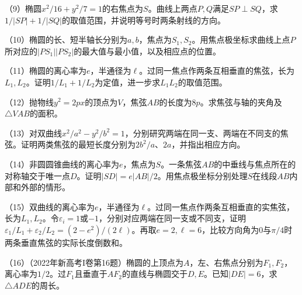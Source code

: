 \begin{exercise}
\begin{samepage}
（9）椭圆\(x^2/16+y^2/7=1\)的右焦点为\(S\)。曲线上两点\(P,Q\)满足\(SP\perp SQ\)，求\(1/|SP|+1/|SQ|\)的取值范围，并说明等号时两条射线的方向。
\par\end{samepage}
\begin{samepage}
（10）椭圆的长、短半轴长分别为\(a,b\)，焦点为\(S_1,S_2\)。用焦点极坐标求曲线上点\(P\)所对应的\(|PS_1||PS_2|\)的最大值与最小值，以及相应点的位置。
\par\end{samepage}
\begin{samepage}
（11）椭圆的离心率为\(e\)，半通径为\(\ell\)。过同一焦点作两条互相垂直的焦弦，长为\(L_1,L_2\)。证明\(1/L_1+1/L_2\)为定值，进一步求\(L_1L_2\)的取值范围。
\par\end{samepage}
\begin{samepage}
（12）抛物线\(y^2=2px\)的顶点为\(V\)，焦弦\(AB\)的长度为\(8p\)。求焦弦与轴的夹角及\(\triangle VAB\)的面积。
\par\end{samepage}
\begin{samepage}
（13）对双曲线\(x^2/a^2-y^2/b^2=1\)，分别研究两端在同一支、两端在不同支的焦弦。证明两类焦弦的最短长度分别为\(2b^2/a\)、\(2a\)，并指出相应方向。
\par\end{samepage}

\begin{samepage}
（14）非圆圆锥曲线的离心率为\(e\)，焦点为\(S\)。一条焦弦\(AB\)的中垂线与焦点所在的对称轴交于唯一点\(D\)。证明\(|SD|=e|AB|/2\)。用焦点极坐标分别处理\(S\)在线段\(AB\)内部和外部的情形。
\par\end{samepage}
\begin{samepage}
（15）双曲线的离心率为\(e\)，半通径为\(\ell\)。过同一焦点作两条互相垂直的实焦弦，长为\(L_1,L_2\)。令\(\varepsilon_i=1\)或\(-1\)，分别对应两端在同一支或不同支，证明\(\varepsilon_1/L_1+\varepsilon_2/L_2=(2-e^2)/(2\ell)\)。再取\(e=2,\ell=6\)，比较方向角为\(0\)与\(\pi/4\)时两条垂直焦弦的实际长度倒数和。
\par\end{samepage}
\begin{samepage}
（16）（2022年新高考I卷第16题）椭圆的上顶点为\(A\)，左、右焦点分别为\(F_1,F_2\)，离心率为\(1/2\)。过\(F_1\)且垂直于\(AF_2\)的直线与椭圆交于\(D,E\)。已知\(|DE|=6\)，求\(\triangle ADE\)的周长。
\par\end{samepage}
\end{exercise}
\endgroup

